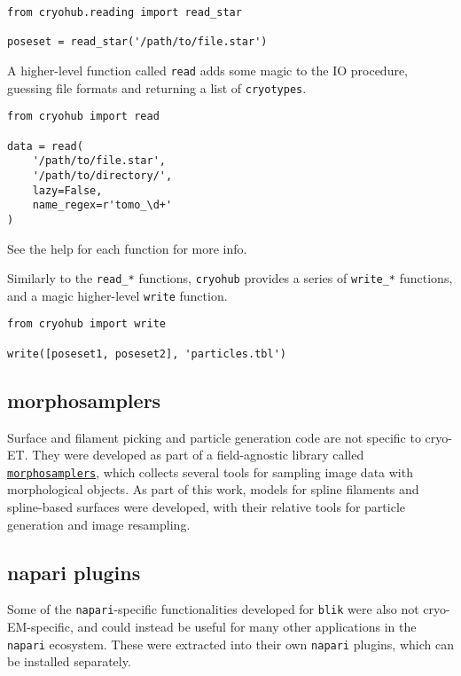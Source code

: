 \begin{verbatim}
from cryohub.reading import read_star

poseset = read_star('/path/to/file.star')
\end{verbatim}

A higher-level function called \texttt{read} adds some magic to the IO procedure, guessing file formats and returning a list of \texttt{cryotypes}.

\begin{verbatim}
from cryohub import read

data = read(
    '/path/to/file.star',
    '/path/to/directory/',
    lazy=False,
    name_regex=r'tomo_\d+'
)
\end{verbatim}

See the help for each function for more info.

Similarly to the \texttt{read\_*} functions, \texttt{cryohub} provides a series of \texttt{write\_*} functions, and a magic higher-level \texttt{write} function.

\begin{verbatim}
from cryohub import write

write([poseset1, poseset2], 'particles.tbl')
\end{verbatim}

\subsection{morphosamplers}\label{morphosamplers}

Surface and filament picking and particle generation code are not specific to cryo-ET. They were developed as part of a field-agnostic library called \href{https://github.com/morphometrics/morphosamplers}{\texttt{morphosamplers}}, which collects several tools for sampling image data with morphological objects. As part of this work, models for spline filaments and spline-based surfaces were developed, with their relative tools for particle generation and image resampling.

\subsection{napari plugins}\label{napari-plugins}

Some of the \texttt{napari}-specific functionalities developed for \texttt{blik} were also not cryo-EM-specific, and could instead be useful for many other applications in the \texttt{napari} ecosystem. These were extracted into their own \texttt{napari} plugins, which can be installed separately.

